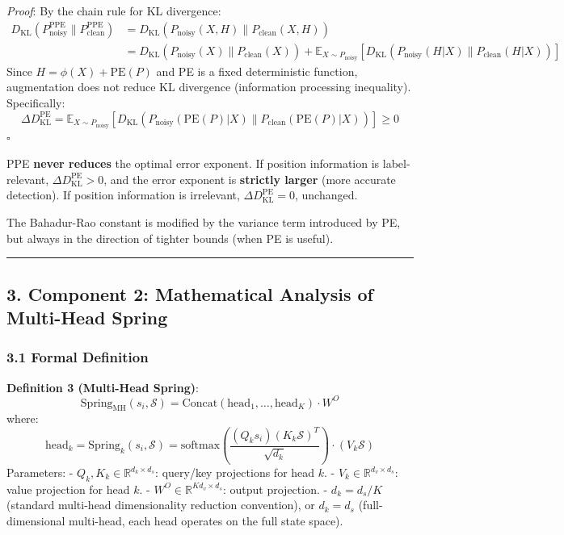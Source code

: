 \documentclass[
  12pt,
]{article}
\begin{document}
\emph{Proof}: By the chain rule for KL divergence:
\begin{align*}
D_{\text{KL}}(P_{\text{noisy}}^{\text{PPE}} \| P_{\text{clean}}^{\text{PPE}})
&= D_{\text{KL}}(P_{\text{noisy}}(X, H) \| P_{\text{clean}}(X, H)) \\
&= D_{\text{KL}}(P_{\text{noisy}}(X) \| P_{\text{clean}}(X)) + \mathbb{E}_{X \sim P_{\text{noisy}}}[D_{\text{KL}}(P_{\text{noisy}}(H|X) \| P_{\text{clean}}(H|X))]
\end{align*}
Since $H = \phi(X) + \text{PE}(P)$ and PE is a fixed deterministic function, augmentation does not reduce KL divergence (information processing inequality). Specifically:
\[\Delta D_{\text{KL}}^{\text{PE}} = \mathbb{E}_{X \sim P_{\text{noisy}}}[D_{\text{KL}}(P_{\text{noisy}}(\text{PE}(P)|X) \| P_{\text{clean}}(\text{PE}(P)|X))] \geq 0\]
$\square$

PPE \textbf{never reduces} the optimal error exponent. If position information is label-relevant, $\Delta D_{\text{KL}}^{\text{PE}} > 0$, and the error exponent is \textbf{strictly larger} (more accurate detection). If position information is irrelevant, $\Delta D_{\text{KL}}^{\text{PE}} = 0$, unchanged.

The Bahadur-Rao constant is modified by the variance term introduced by PE, but always in the direction of tighter bounds (when PE is useful).

\begin{center}\rule{0.5\linewidth}{0.5pt}\end{center}

\subsection{3. Component 2: Mathematical Analysis of Multi-Head Spring}\label{component-2-multi-head-spring}

\subsubsection{3.1 Formal Definition}\label{multi-head-spring-definition}

\textbf{Definition 3 (Multi-Head Spring)}:
\[\boxed{\text{Spring}_{\text{MH}}(s_i, \mathcal{S}) = \text{Concat}(\text{head}_1, \ldots, \text{head}_K) \cdot W^O}\]
where:
\[\text{head}_k = \text{Spring}_k(s_i, \mathcal{S}) = \text{softmax}\left(\frac{(Q_k s_i)(K_k \mathcal{S})^T}{\sqrt{d_k}}\right) \cdot (V_k \mathcal{S})\]
Parameters:
- $Q_k, K_k \in \mathbb{R}^{d_k \times d_s}$: query/key projections for head $k$.
- $V_k \in \mathbb{R}^{d_v \times d_s}$: value projection for head $k$.
- $W^O \in \mathbb{R}^{K d_v \times d_s}$: output projection.
- $d_k = d_s / K$ (standard multi-head dimensionality reduction convention), or $d_k = d_s$ (full-dimensional multi-head, each head operates on the full state space).
\end{document}
